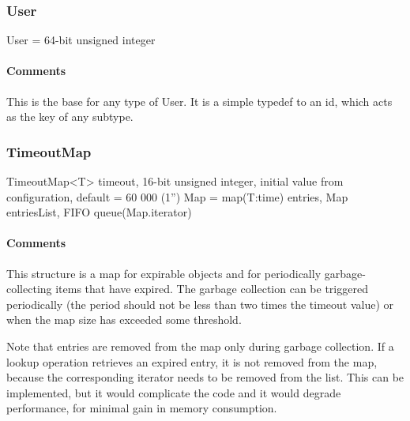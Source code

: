 \documentclass[a4paper,10pt,draft]{article}
\begin{document}
\subsubsection{User}

\begin{verbbox}
User = 64-bit unsigned integer
\end{verbbox}
\begin{center}
\theverbbox
\end{center}

\begin{inparaitem}[ ]
 \item \infrastructure
\end{inparaitem}

\paragraph*{Comments}
This is the base for any type of User. It is a simple typedef to an id, which acts as the key of any subtype.

\subsubsection{TimeoutMap}

\begin{verbbox}
TimeoutMap<T>
{
  timeout, 16-bit unsigned integer,
    initial value from configuration, default = 60 000 (1'')
  Map = map(T:time)
  entries, Map
  entriesList, FIFO queue(Map.iterator)
}
\end{verbbox}
\begin{center}
\theverbbox
\end{center}

\begin{inparaitem}[ ]
 \item \infrastructure
\end{inparaitem}

\paragraph*{Comments}
This structure is a map for expirable objects and for periodically garbage-collecting items that have expired. The garbage collection can be triggered periodically (the period 
should not be less than two times the timeout value) or when the map size has exceeded some threshold.

Note that entries are removed from the map only during garbage collection. If a lookup operation retrieves an expired entry, it is not removed from the map, because the 
corresponding iterator needs to be removed from the list. This can be implemented, but it would complicate the code and it would degrade performance, for minimal gain in memory 
consumption.
\end{document}

